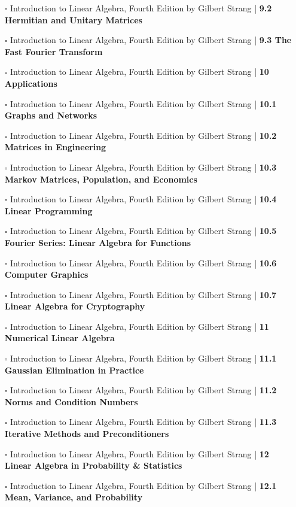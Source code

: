 \documentclass[a4, landscape, 12pt]{article}
\newcommand{\checkbox}{$\square$}%
\begin{document}
\begin{itemize}
{}
\item [\checkbox] Introduction to Linear Algebra, Fourth Edition by Gilbert Strang  | \textbf{9.2 Hermitian and Unitary Matrices
}
\item [\checkbox] Introduction to Linear Algebra, Fourth Edition by Gilbert Strang  | \textbf{9.3 The Fast Fourier Transform
}
\item [\checkbox] Introduction to Linear Algebra, Fourth Edition by Gilbert Strang  | \textbf{10 Applications
}
\item [\checkbox] Introduction to Linear Algebra, Fourth Edition by Gilbert Strang  | \textbf{10.1 Graphs and Networks
}
\item [\checkbox] Introduction to Linear Algebra, Fourth Edition by Gilbert Strang  | \textbf{10.2 Matrices in Engineering
}
\item [\checkbox] Introduction to Linear Algebra, Fourth Edition by Gilbert Strang  | \textbf{10.3 Markov Matrices, Population, and Economics
}
\item [\checkbox] Introduction to Linear Algebra, Fourth Edition by Gilbert Strang  | \textbf{10.4 Linear Programming
}
\item [\checkbox] Introduction to Linear Algebra, Fourth Edition by Gilbert Strang  | \textbf{10.5 Fourier Series: Linear Algebra for Functions
}
\item [\checkbox] Introduction to Linear Algebra, Fourth Edition by Gilbert Strang  | \textbf{10.6 Computer Graphics
}
\item [\checkbox] Introduction to Linear Algebra, Fourth Edition by Gilbert Strang  | \textbf{10.7 Linear Algebra for Cryptography
}
\item [\checkbox] Introduction to Linear Algebra, Fourth Edition by Gilbert Strang  | \textbf{11 Numerical Linear Algebra
}
\item [\checkbox] Introduction to Linear Algebra, Fourth Edition by Gilbert Strang  | \textbf{11.1 Gaussian Elimination in Practice
}
\item [\checkbox] Introduction to Linear Algebra, Fourth Edition by Gilbert Strang  | \textbf{11.2 Norms and Condition Numbers
}
\item [\checkbox] Introduction to Linear Algebra, Fourth Edition by Gilbert Strang  | \textbf{11.3 Iterative Methods and Preconditioners
}
\item [\checkbox] Introduction to Linear Algebra, Fourth Edition by Gilbert Strang  | \textbf{12 Linear Algebra in Probability & Statistics
}
\item [\checkbox] Introduction to Linear Algebra, Fourth Edition by Gilbert Strang  | \textbf{12.1 Mean, Variance, and Probability
}
\end{itemize}
\end{document}
